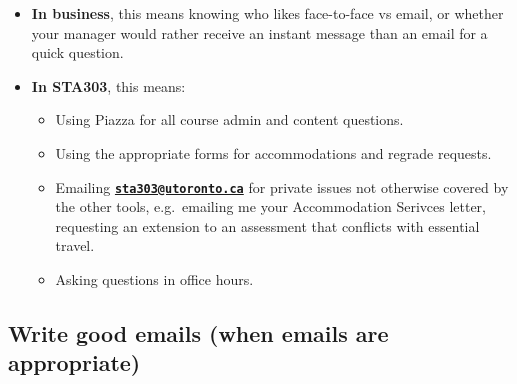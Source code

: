 \documentclass[
]{book}
\providecommand{\tightlist}{%
  \setlength{\itemsep}{0pt}\setlength{\parskip}{0pt}}
\begin{document}
\begin{itemize}
\tightlist
\item
  \textbf{In business}, this means knowing who likes face-to-face vs email, or whether your manager would rather receive an instant message than an email for a quick question.
\item
  \textbf{In STA303}, this means:

  \begin{itemize}
  \tightlist
  \item
    Using Piazza for all course admin and content questions.
  \item
    Using the appropriate forms for accommodations and regrade requests.
  \item
    Emailing \textbf{\href{mailto:sta303@utoronto.ca}{\nolinkurl{sta303@utoronto.ca}}} for private issues not otherwise covered by the other tools, e.g.~emailing me your Accommodation Serivces letter, requesting an extension to an assessment that conflicts with essential travel.
  \item
    Asking questions in office hours.
  \end{itemize}
\end{itemize}

\hypertarget{write-good-emails-when-emails-are-appropriate}{%
\subsection{Write good emails (when emails are appropriate)}\label{write-good-emails-when-emails-are-appropriate}}
\end{document}
